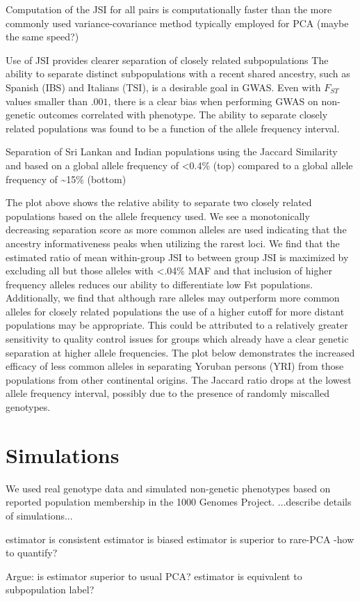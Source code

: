 \documentclass[english]{article}
\begin{document}
Computation of the JSI for all pairs is computationally faster than
the more commonly used variance-covariance method typically employed
for PCA (maybe the same speed?)

Use of JSI provides clearer separation of closely related subpopulations
The ability to separate distinct subpopulations with a recent shared
ancestry, such as Spanish (IBS) and Italians (TSI), is a desirable
goal in GWAS. Even with $F_{ST}$ values smaller than $.001$, there
is a clear bias when performing GWAS on non-genetic outcomes correlated
with phenotype. The ability to separate closely related populations
was found to be a function of the allele frequency interval.

Separation of Sri Lankan and Indian populations using the Jaccard
Similarity and based on a global allele frequency of <0.4\% (top)
compared to a global allele frequency of \textasciitilde{}15\% (bottom)

The plot above shows the relative ability to separate two closely
related populations based on the allele frequency used. We see a monotonically
decreasing separation score as more common alleles are used indicating
that the ancestry informativeness peaks when utilizing the rarest
loci. We find that the estimated ratio of mean within-group JSI to
between group JSI is maximized by excluding all but those alleles
with <.04\% MAF and that inclusion of higher frequency alleles reduces
our ability to differentiate low Fst populations. Additionally, we
find that although rare alleles may outperform more common alleles
for closely related populations the use of a higher cutoff for more
distant populations may be appropriate. This could be attributed to
a relatively greater sensitivity to quality control issues for groups
which already have a clear genetic separation at higher allele frequencies.
The plot below demonstrates the increased efficacy of less common
alleles in separating Yoruban persons (YRI) from those populations
from other continental origins. The Jaccard ratio drops at the lowest
allele frequency interval, possibly due to the presence of randomly
miscalled genotypes.


\section*{Simulations}

We used real genotype data and simulated non-genetic phenotypes based
on reported population membership in the 1000 Genomes Project. ...describe
details of simulations...

estimator is consistent estimator is biased estimator is superior
to rare-PCA -how to quantify?

Argue: is estimator superior to usual PCA? estimator is equivalent
to subpopulation label?



\end{document}
